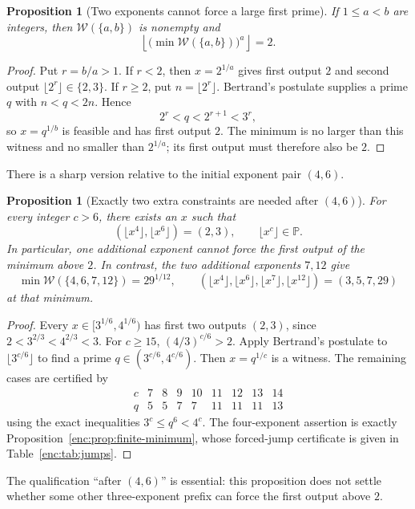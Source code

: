 \documentclass[11pt,a4paper]{article}
\newtheorem{proposition}[theorem]{Proposition}
\theoremstyle{definition}
\theoremstyle{remark}
\numberwithin{equation}{section}
\begin{document}
\begin{proposition}[Two exponents cannot force a large first prime]
\label{enc:sp:two-exponents}
If $1\le a<b$ are integers, then $\mathcal W(\{a,b\})$ is nonempty and
\[
 \left\lfloor\bigl(\min\mathcal W(\{a,b\})\bigr)^a\right\rfloor=2.
\]
\end{proposition}
\begin{proof}
Put $r=b/a>1$. If $r<2$, then $x=2^{1/a}$ gives first output $2$ and
second output $\lfloor2^r\rfloor\in\{2,3\}$. If $r\ge2$, put
$n=\lfloor2^r\rfloor$. Bertrand's postulate supplies a prime $q$ with
$n<q<2n$. Hence
\[
 2^r<q<2^{r+1}<3^r,
\]
so $x=q^{1/b}$ is feasible and has first output $2$. The minimum is no
larger than this witness and no smaller than $2^{1/a}$; its first output
must therefore also be $2$.
\end{proof}

There is a sharp version relative to the initial exponent pair $(4,6)$.
\begin{proposition}[Exactly two extra constraints are needed after $(4,6)$]
\label{enc:sp:sharp-four-six}
For every integer $c>6$, there exists an $x$ such that
\[
 (\lfloor x^4\rfloor,\lfloor x^6\rfloor)=(2,3),\qquad
 \lfloor x^c\rfloor\in\mathbb P.
\]
In particular, one additional exponent cannot force the first output of
the minimum above $2$. In contrast, the two additional exponents $7,12$
give
\[
 \min\mathcal W(\{4,6,7,12\})=29^{1/12},\qquad
 (\lfloor x^4\rfloor,\lfloor x^6\rfloor,\lfloor x^7\rfloor,
 \lfloor x^{12}\rfloor)=(3,5,7,29)
\]
at that minimum.
\end{proposition}
\begin{proof}
Every $x\in[3^{1/6},4^{1/6})$ has first two outputs $(2,3)$, since
$2<3^{2/3}<4^{2/3}<3$. For $c\ge15$,
$(4/3)^{c/6}>2$. Apply Bertrand's postulate to
$\lfloor3^{c/6}\rfloor$ to find a prime
$q\in(3^{c/6},4^{c/6})$. Then $x=q^{1/c}$ is a witness. The remaining
cases are certified by
\[
\begin{array}{c|rrrrrrrr}
 c&7&8&9&10&11&12&13&14\\ \hline
 q&5&5&7&7&11&11&11&13
\end{array}
\]
using the exact inequalities $3^c\le q^6<4^c$.
The four-exponent assertion is exactly Proposition~\ref{enc:prop:finite-minimum},
whose forced-jump certificate is given in Table~\ref{enc:tab:jumps}.
\end{proof}

The qualification ``after $(4,6)$'' is essential: this proposition does
not settle whether some other three-exponent prefix can force the first
output above $2$.
\end{document}
